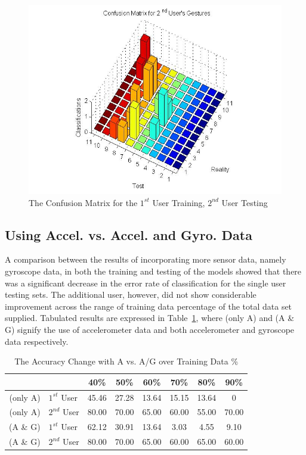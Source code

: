 \documentclass[conference]{IEEEtran}
\newcommand{\TabRef}[1]{Table~\ref{tab:#1}}
\begin{document}
\begin{figure}[h]
\begin{center}
\noindent
  \includegraphics[width=\columnwidth]{User2}
  \caption{The Confusion Matrix for the $1^{st}$ User Training, $2^{nd}$ User Testing} \label{fig:User2}
\end{center}
\end{figure}

\hfill


\subsection{Using Accel. vs. Accel. and Gyro. Data}
A comparison between the results of incorporating more sensor data, namely gyroscope data, in both the training and testing of the models showed that there was a significant decrease in the error rate of classification for the single user testing sets. The additional user, however, did not show considerable improvement across the range of training data percentage of the total data set supplied. Tabulated results are expressed in \TabRef{AvsAG}, where (only A) and (A \& G) signify the use of accelerometer data and both accelerometer and gyroscope data respectively.


\begin{table}[h]
\renewcommand{\arraystretch}{1.5}
\caption{The Accuracy Change with A vs. A/G over Training Data \%} \label{tab:AvsAG}
\centering
\resizebox{8cm}{!} {
\begin{tabular}{r l||c|c|c|c|c|c}
    \hline    \hline
    &  & 40\%  & 50\%  & 60\%  & 70\%  & 80\%  & 90\% \\
    \hline    \hline
      (only A) & $ 1^{st}$ User & 45.46 & 27.28 & 13.64 & 15.15 & 13.64 & 0\\
     \hline
     (only A) & $2^{nd}$ User  & 80.00 & 70.00 & 65.00 & 60.00 & 55.00 & 70.00\\
     \hline     \hline
     (A \& G) & $1^{st}$ User & 62.12 & 30.91 & 13.64 & 3.03 & 4.55 & 9.10\\
     \hline
     (A \& G) & $2^{nd}$ User & 80.00 & 70.00 & 65.00 & 60.00 & 65.00 & 60.00\\
    \hline    \hline
\end{tabular}
}
\end{table}
\end{document}
